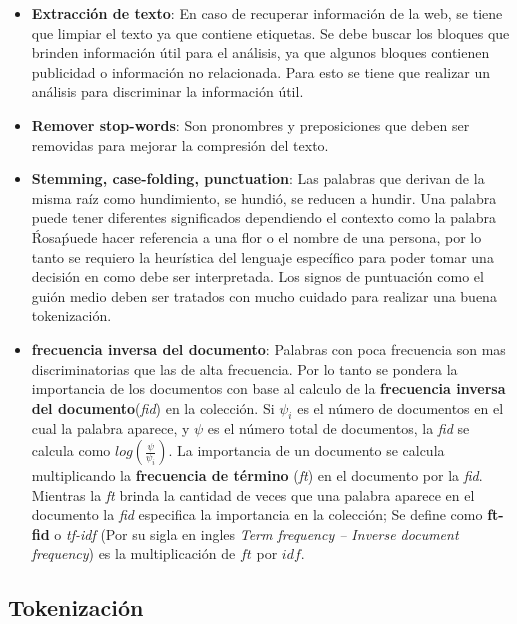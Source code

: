 \begin{itemize}

	\item \textbf{Extracción de texto}: En caso de recuperar información de la web, se tiene que limpiar el texto ya que contiene etiquetas. Se debe buscar los bloques que brinden información útil para el análisis, ya que algunos bloques contienen publicidad o información no relacionada. Para esto se tiene que realizar un análisis para discriminar la información útil.

	\item \textbf{Remover stop-words}: Son pronombres y preposiciones que deben ser removidas para mejorar la compresión del texto.

	\item  \textbf{Stemming, case-folding, punctuation}: Las palabras que derivan de la misma raíz como hundimiento, se hundió, se reducen a hundir. Una palabra puede tener diferentes significados dependiendo el contexto como la palabra \'Rosa\' puede hacer referencia a una flor o el nombre de una persona, por lo tanto se requiero la heurística del lenguaje específico para poder tomar una decisión en como debe ser interpretada. Los signos de puntuación como el guión medio deben ser tratados con mucho cuidado para realizar una buena tokenización.

	\item \textbf{frecuencia inversa del documento}: Palabras con poca frecuencia son mas discriminatorias que las de alta frecuencia. Por lo tanto se pondera la importancia de los documentos con base al calculo de la \textbf{frecuencia inversa del documento}(\textit{fid}) en la colección. Si $\psi_i$ es el número de documentos en el cual la palabra aparece, y $\psi$ es el número total de documentos, la \textit{fid} se calcula como $log(\frac{\psi}{\psi_i})$. La importancia de un documento se calcula multiplicando la \textbf{frecuencia de término} (\textit{ft}) en el documento por la \textit{fid}. Mientras la \textit{ft} brinda la cantidad de veces  que una palabra aparece en el documento la \textit{fid} especifica la importancia en la colección; Se define como \textbf{ft-fid} o \textit{tf-idf} (Por su sigla en ingles \textit{Term frequency – Inverse document frequency}) es la multiplicación de $ft$ por $idf$.

\end{itemize}


\subsection{Tokenización}

